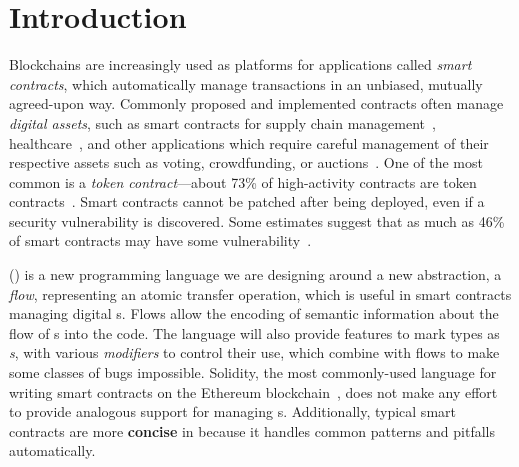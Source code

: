 \documentclass[nonacm, dvipsnames, sigconf]{acmart}
\begin{document}

\maketitle

\section{Introduction}

Blockchains are increasingly used as platforms for applications called \emph{smart contracts}, which automatically manage transactions in an unbiased, mutually agreed-upon way.
Commonly proposed and implemented contracts often manage \emph{digital assets}, such as smart contracts for supply chain management~\cite{SupplyChainUse}, healthcare~\cite{HealthcareUse}, and other applications which require careful management of their respective assets such as voting, crowdfunding, or auctions~\cite{Elsden18:Making}.
One of the most common is a \emph{token contract}---about 73\% of high-activity contracts are token contracts~\cite{OlivaEtAl2019}.
Smart contracts cannot be patched after being deployed, even if a security vulnerability is discovered.
Some estimates suggest that as much as 46\% of smart contracts may have some vulnerability~\cite{luuOyente}.

\langName (\langNamePronounce) is a new programming language we are designing around a new abstraction, a \emph{flow}, representing an atomic transfer operation, which is useful in smart contracts managing digital \assetTxt{}s.
Flows allow the encoding of semantic information about the flow of \assetTxt{}s into the code.
The \langName language will also provide features to mark types as \emph{\assetTxt{}s}, with various \emph{modifiers} to control their use, which combine with flows to make some classes of bugs impossible.
Solidity, the most commonly-used language for writing smart contracts on the Ethereum blockchain~\cite{EthereumForDevs}, does not make any effort to provide analogous support for managing \assetTxt{}s.
Additionally, typical smart contracts are more \textbf{concise} in \langName because it handles common patterns and pitfalls automatically.
\end{document}
